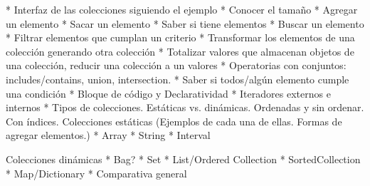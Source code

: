 \documentclass[a4paper,12pt]{book}
\begin{document}
* Interfaz de las colecciones siguiendo el ejemplo
  * Conocer el tamaño
  * Agregar un elemento
  * Sacar un elemento
  * Saber si tiene elementos
  * Buscar un elemento
  * Filtrar elementos que cumplan un criterio
  * Transformar los elementos de una colección generando otra colección
  * Totalizar valores que almacenan objetos de una colección, reducir una colección a un valores
  * Operatorias con conjuntos: includes/contains, union, intersection.
  * Saber si todos/algún elemento cumple una condición
  * Bloque de código y Declaratividad
* Iteradores externos e internos
* Tipos de colecciones. Estáticas vs. dinámicas. Ordenadas y sin ordenar. Con índices.
  Colecciones estáticas (Ejemplos de cada una de ellas. Formas de agregar elementos.)
  * Array
  * String
  * Interval
  
  Colecciones dinámicas
  * Bag?
  * Set
  * List/Ordered Collection
  * SortedCollection
  * Map/Dictionary
  * Comparativa general

  
  
\end{document}
